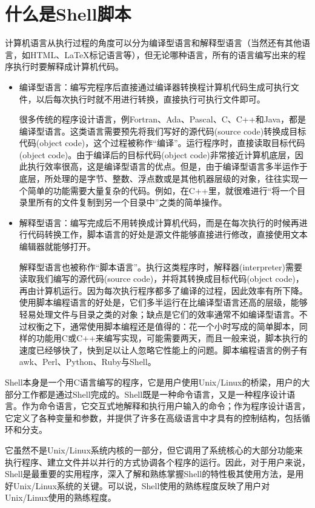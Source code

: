 \section{什么是Shell脚本}
计算机语言从执行过程的角度可以分为编译型语言和解释型语言（当然还有其他语言，如HTML、\LaTeX 标记语言等），但无论哪种语言，所有的语言编写出来的程序执行时要解释成计算机代码。
\begin{itemize}
\item 编译型语言：编写完程序后直接通过编译器转换程计算机代码生成可执行文件，以后每次执行时就不用进行转换，直接执行可执行文件即可。

很多传统的程序设计语言，例Fortran、Ada、Pascal、C、C++和Java，都是编译型语言。这类语言需要预先将我们写好的源代码(source code)转换成目标代码(object code)，这个过程被称作“编译”。运行程序时，直接读取目标代码(object code)。由于编译后的目标代码(object code)非常接近计算机底层，因此执行效率很高，这是编译型语言的优点。但是，由于编译型语言多半运作于底层，所处理的是字节、整数、浮点数或是其他机器层级的对象，往往实现一个简单的功能需要大量复杂的代码。例如，在C++里，就很难进行“将一个目录里所有的文件复制到另一个目录中”之类的简单操作。

\item 解释型语言：编写完成后不用转换成计算机代码，而是在每次执行的时候再进行代码转换工作，脚本语言的好处是源文件能够直接进行修改，直接使用文本编辑器就能够打开。

解释型语言也被称作“脚本语言”。执行这类程序时，解释器(interpreter)需要读取我们编写的源代码(source code)，并将其转换成目标代码(object code)，再由计算机运行。因为每次执行程序都多了编译的过程，因此效率有所下降。使用脚本编程语言的好处是，它们多半运行在比编译型语言还高的层级，能够轻易处理文件与目录之类的对象；缺点是它们的效率通常不如编译型语言。不过权衡之下，通常使用脚本编程还是值得的：花一个小时写成的简单脚本，同样的功能用C或C++来编写实现，可能需要两天，而且一般来说，脚本执行的速度已经够快了，快到足以让人忽略它性能上的问题。脚本编程语言的例子有awk、Perl、Python、Ruby与Shell。
\end{itemize}

Shell本身是一个用C语言编写的程序，它是用户使用Unix/Linux的桥梁，用户的大部分工作都是通过Shell完成的。Shell既是一种命令语言，又是一种程序设计语言。作为命令语言，它交互式地解释和执行用户输入的命令；作为程序设计语言，它定义了各种变量和参数，并提供了许多在高级语言中才具有的控制结构，包括循环和分支。

它虽然不是Unix/Linux系统内核的一部分，但它调用了系统核心的大部分功能来执行程序、建立文件并以并行的方式协调各个程序的运行。因此，对于用户来说，Shell是最重要的实用程序，深入了解和熟练掌握Shell的特性极其使用方法，是用好Unix/Linux系统的关键。可以说，Shell使用的熟练程度反映了用户对Unix/Linux使用的熟练程度。

